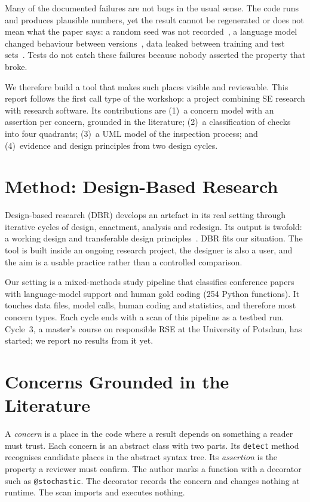 \documentclass[conference,10pt]{IEEEtran}
\newcommand{\cc}[1]{\texttt{#1}}
\begin{document}
Many of the documented failures are not bugs in the usual sense. The code runs and produces plausible numbers, yet the result cannot be regenerated or does not mean what the paper says: a random seed was not recorded~\cite{sandve2013}, a language model changed behaviour between versions~\cite{chen2024}, data leaked between training and test sets~\cite{kapoor2023}. Tests do not catch these failures because nobody asserted the property that broke.

We therefore build a tool that makes such places visible and reviewable. This report follows the first call type of the workshop: a project combining SE research with research software. Its contributions are (1)~a concern model with an assertion per concern, grounded in the literature; (2)~a classification of checks into four quadrants; (3)~a UML model of the inspection process; and (4)~evidence and design principles from two design cycles.

\section{Method: Design-Based Research}
Design-based research (DBR) develops an artefact in its real setting through iterative cycles of design, enactment, analysis and redesign. Its output is twofold: a working design and transferable design principles~\cite{dbrc2003,barab2004}. DBR fits our situation. The tool is built inside an ongoing research project, the designer is also a user, and the aim is a usable practice rather than a controlled comparison.

Our setting is a mixed-methods study pipeline that classifies conference papers with language-model support and human gold coding (254 Python functions). It touches data files, model calls, human coding and statistics, and therefore most concern types. Each cycle ends with a scan of this pipeline as a testbed run. Cycle~3, a master's course on responsible RSE at the University of Potsdam, has started; we report no results from it yet.

\section{Concerns Grounded in the Literature}
A \emph{concern} is a place in the code where a result depends on something a reader must trust. Each concern is an abstract class with two parts. Its \cc{detect} method recognises candidate places in the abstract syntax tree. Its \emph{assertion} is the property a reviewer must confirm. The author marks a function with a decorator such as \cc{@stochastic}. The decorator records the concern and changes nothing at runtime. The scan imports and executes nothing.
\end{document}
